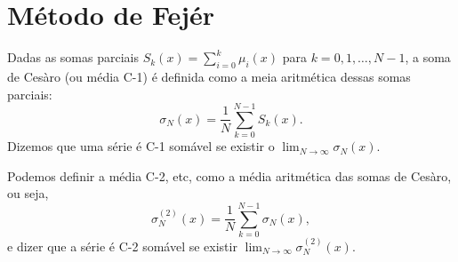 \section{Método de Fejér}
\begin{defi}
  Dadas as somas parciais $S_k(x) = \sum_{i = 0}^k \mu_i(x)$ para $k = 0, 1,
  \ldots, N - 1$, a soma de Ces\`{a}ro (ou média C-1) é definida como a meia
  aritmética dessas somas parciais:
  \begin{dmath*}
    \sigma_N(x) = \frac{1}{N} \sum_{k = 0}^{N - 1} S_k(x).
  \end{dmath*}
  Dizemos que uma série é C-1 somável se existir o $\lim_{N \to \infty}
  \sigma_N(x)$.
\end{defi}
\begin{obs}
  Podemos definir a média C-2, etc, como a média aritmética das somas de
  Ces\`{a}ro, ou seja,
  \begin{dmath*}
    \sigma_N^{(2)}(x) = \frac{1}{N} \sum_{k = 0}^{N - 1} \sigma_N(x),
  \end{dmath*}
  e dizer que a série é C-2 somável se existir $\lim_{N \to \infty}
  \sigma_N^{(2)}(x)$.
\end{obs}
